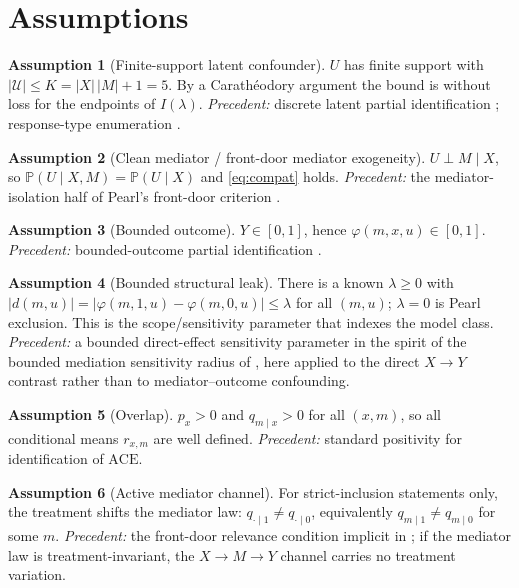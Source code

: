 \documentclass[11pt]{article}
\renewcommand{\Pr}{\mathbb{P}}
\theoremstyle{definition}
\newtheorem{assumption}{Assumption}
\theoremstyle{plain}
\theoremstyle{remark}
\begin{document}
\section{Assumptions}
\label{sec:assumptions}
\begin{assumption}[Finite-support latent confounder]\label{ass:finite}
$U$ has finite support with $|\mathcal U|\le K=|X|\,|M|+1=5$. By a Carath\'eodory argument the bound is
without loss for the endpoints of $I(\lambda)$. \emph{Precedent:} discrete latent partial identification
\citep{FinkelsteinAdamsSariaShpitser2020MeasurementError}; response-type enumeration \citep{BalkePearl1997Bounds}.
\end{assumption}
\begin{assumption}[Clean mediator / front-door mediator exogeneity]\label{ass:clean}
$U\perp M\mid X$, so $\Pr(U\mid X,M)=\Pr(U\mid X)$ and \eqref{eq:compat} holds. \emph{Precedent:} the
mediator-isolation half of Pearl's front-door criterion \citep{Pearl1995CausalDiagrams}.
\end{assumption}
\begin{assumption}[Bounded outcome]\label{ass:bounded}
$Y\in[0,1]$, hence $\varphi(m,x,u)\in[0,1]$. \emph{Precedent:} bounded-outcome partial identification
\citep{Manski1990NonparametricBounds}.
\end{assumption}
\begin{assumption}[Bounded structural leak]\label{ass:leak}
There is a known $\lambda\ge0$ with $|d(m,u)|=|\varphi(m,1,u)-\varphi(m,0,u)|\le\lambda$ for all $(m,u)$;
$\lambda=0$ is Pearl exclusion. This is the scope/sensitivity parameter that indexes the model class.
\emph{Precedent:} a bounded direct-effect sensitivity parameter in the spirit of the bounded mediation
sensitivity radius of \citet{DingVanderWeele2016SharpMediationSensitivity}, here applied to the direct
$X\to Y$ contrast rather than to mediator--outcome confounding.
\end{assumption}
\begin{assumption}[Overlap]\label{ass:overlap}
$p_x>0$ and $q_{m\mid x}>0$ for all $(x,m)$, so all conditional means $r_{x,m}$ are well defined.
\emph{Precedent:} standard positivity for identification of $\mathrm{ACE}$.
\end{assumption}
\begin{assumption}[Active mediator channel]\label{ass:mediator-shift}
For strict-inclusion statements only, the treatment shifts the mediator law:
$q_{\cdot\mid1}\neq q_{\cdot\mid0}$, equivalently $q_{m\mid1}\neq q_{m\mid0}$ for some $m$.
\emph{Precedent:} the front-door relevance condition implicit in \citet{Pearl1995CausalDiagrams}; if the
mediator law is treatment-invariant, the $X\to M\to Y$ channel carries no treatment variation.
\end{assumption}
\end{document}
